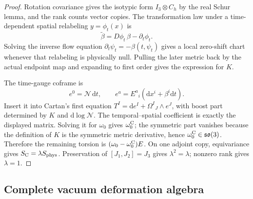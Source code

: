 \documentclass[11pt]{article}
\theoremstyle{definition}
\theoremstyle{remark}
\newcommand{\dd}{\mathrm d}
\newcommand{\so}{\mathfrak{so}}
\begin{document}
\begin{proof}
Rotation covariance gives the isotypic form \(I_3\otimes C_h\) by the real
Schur lemma, and the rank counts vector copies.  The transformation law under
a time-dependent spatial relabeling \(y=\phi_t(x)\) is
\[
 \widetilde\beta=D\phi_t\,\beta-\partial_t\phi_t.
\]
Solving the inverse flow equation
\(\partial_t\psi_t=-\beta(t,\psi_t)\) gives a local zero-shift chart whenever
that relabeling is physically null.  Pulling the later metric back by the
actual endpoint map and expanding to first order gives the expression for
\(K\).

The time-gauge coframe is
\[
 e^0=\mathcal N\,\dd t,
 \qquad
 e^a=E^a{}_i(\dd x^i+\beta^i\dd t).
\]
Insert it into Cartan's first equation
\(T^I=\dd e^I+\Omega^I{}_J\wedge e^J\), with boost part determined by
\(K\) and \(\dd\log\mathcal N\).  The temporal--spatial coefficient is exactly
the displayed matrix.  Solving it for \(\omega_0\) gives
\(\omega_0^{\rm C}\); the symmetric part vanishes because the definition of
\(K\) is the symmetric metric derivative, hence
\(\omega_0^{\rm C}\in\so(3)\).  Therefore the remaining torsion is
\((\omega_0-\omega_0^{\rm C})E\).  On one adjoint copy, equivariance gives
\(S_{\rm C}=\lambda S_{\rm phys}\).  Preservation of
\([J_1,J_2]=J_3\) gives \(\lambda^2=\lambda\); nonzero rank gives
\(\lambda=1\).
\end{proof}

\subsection{Complete vacuum deformation algebra}
\end{document}
